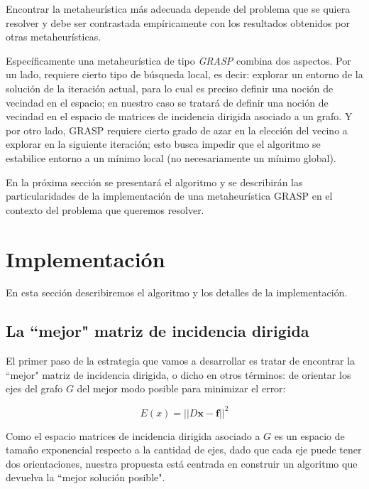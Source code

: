 \documentclass[10pt, a4paper, twocolumn]{article} %
\begin{document}
Encontrar la metaheurística más adecuada depende del problema que se 
quiera resolver y debe ser contrastada empíricamente con los resultados 
obtenidos por otras metaheurísticas.

\smallskip

Específicamente una metaheurística de tipo \textit{GRASP} combina dos 
aspectos. Por un lado, requiere cierto tipo de búsqueda local, es decir: 
explorar un entorno de la solución de la iteración actual, para lo cual 
es preciso definir una noción de vecindad en el espacio; en nuestro caso 
se tratará de definir una noción de vecindad en el espacio de matrices 
de incidencia dirigida asociado a un grafo. Y por otro lado, GRASP 
requiere cierto grado de azar en la elección del vecino a explorar en 
la siguiente iteración; esto busca impedir que el algoritmo se 
estabilice entorno a un mínimo local (no necesariamente un mínimo 
global). 

\smallskip

En la próxima sección se presentará el algoritmo y se describirán las 
particularidades de la implementación de una metaheurística GRASP en el 
contexto del problema que queremos resolver.

\section{Implementación}

En esta sección describiremos el algoritmo y los detalles de la 
implementación.

\subsection{La ``mejor" matriz de incidencia dirigida}

El primer paso de la estrategia que vamos a desarrollar es tratar de 
encontrar la ``mejor" matriz de incidencia dirigida, o dicho en otros 
términos: de orientar los ejes del grafo $G$ del mejor modo posible para 
minimizar el error:

$$E(x) = ||D\bm{x}-\bm{f}||^2$$
 
Como el espacio matrices de incidencia dirigida asociado a $G$ es un 
espacio de tamaño exponencial respecto a la cantidad de ejes, dado que 
cada eje puede tener dos orientaciones, nuestra propuesta está centrada 
en construir un algoritmo que devuelva la ``mejor solución posible".

\bigskip

\end{document}
